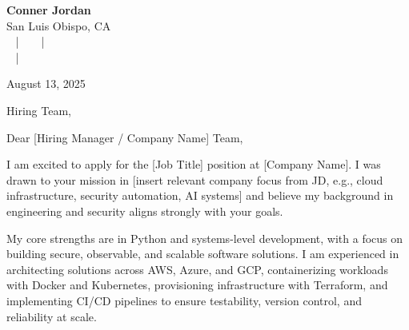 \documentclass[letterpaper,11pt]{article}
\begin{document}
\begin{center}
  {\Huge \textbf{Conner Jordan}}\\[4pt]
  {\Large San Luis Obispo, CA}\\[4pt]
  \href{tel:+18059759793}{
    } ~ | ~
  \href{mailto:connercharlesjordan@gmail.com}{
    } ~ | ~
   \\
  \href{https://www.linkedin.com/in/conner-jordan-4b268514a/}{
    } ~ | ~
  \href{https://github.com/cjordan223}{
    }
\end{center}

\vspace{16pt}

\begin{flushright}
August 13, 2025
\end{flushright}

\noindent
Hiring Team,

\vspace{16pt}


Dear [Hiring Manager / Company Name] Team,

I am excited to apply for the [Job Title] position at [Company Name]. I was drawn to your mission in [insert relevant company focus from JD, e.g., cloud infrastructure, security automation, AI systems] and believe my background in engineering and security aligns strongly with your goals.

My core strengths are in Python and systems-level development, with a focus on building secure, observable, and scalable software solutions. I am experienced in architecting solutions across AWS, Azure, and GCP, containerizing workloads with Docker and Kubernetes, provisioning infrastructure with Terraform, and implementing CI/CD pipelines to ensure testability, version control, and reliability at scale.

\vspace{16pt}
\end{document}
